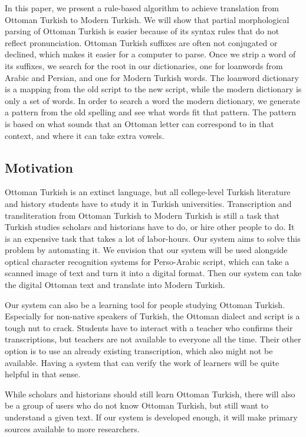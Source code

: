 \documentclass[10pt,twocolumn]{article}
\theoremstyle{nonumberplain}
\begin{document}
In this paper, we present a rule-based algorithm to achieve translation from
Ottoman Turkish to Modern Turkish.  We will show that partial morphological
parsing of Ottoman Turkish is easier because of its syntax rules that do not
reflect pronunciation. Ottoman Turkish suffixes are often not conjugated or
declined, which makes it easier for a computer to parse.
Once we strip a word of its suffixes, we search for the root in our
dictionaries, one for loanwords from Arabic and Persian, and one for Modern
Turkish words. The loanword dictionary is a mapping
from the old script to the new script, while the modern dictionary is only a
set of words. In order to search a word the modern dictionary, we generate a
pattern from the old spelling and see what words fit that pattern.
The pattern is based on what sounds that an Ottoman letter can correspond to in
that context, and where it can take extra vowels.

\subsection{Motivation}

Ottoman Turkish is an extinct language, but all college-level Turkish
literature and history students have to study it in Turkish universities.
Transcription and transliteration from Ottoman Turkish to Modern Turkish is
still a task that Turkish studies scholars and historians have to do, or hire
other people to do. It is an expensive task that takes a lot of labor-hours.
Our system aims to solve this problem by automating it.
We envision that our system will be used alongside optical character
recognition systems for Perso-Arabic script, which can take a scanned image of
text and turn it into a digital format.
Then our system can take the digital Ottoman text and translate into Modern Turkish.

Our system can also be a learning tool for people studying Ottoman Turkish.
Especially for non-native speakers of Turkish, the Ottoman dialect and script
is a tough nut to crack. Students have to interact with a teacher who confirms
their transcriptions, but teachers are not available to everyone all the time.
Their other option is to use an already existing transcription, which also might not be available.
Having a system that can verify the work of learners will be quite helpful in that sense.

While scholars and historians should still learn Ottoman Turkish, there will
also be a group of users who do not know Ottoman Turkish, but still want to
understand a given text. If our system is developed enough, it will make
primary sources available to more researchers.
\end{document}
